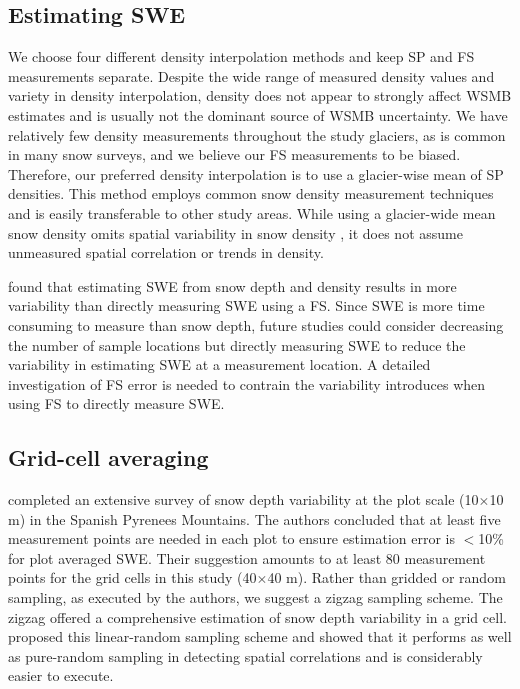 \documentclass[twocolumn,letterpaper]{igs}
\begin{document}
\subsection{Estimating SWE}

We choose four different density interpolation methods and keep SP and FS measurements separate. Despite the wide range of measured density values and variety in density interpolation, density does not appear to strongly affect WSMB estimates and is usually not the dominant source of WSMB uncertainty. We have relatively few density measurements throughout the study glaciers, as is common in many snow surveys, and we believe our FS measurements to be biased. Therefore, our preferred density interpolation is to use a glacier-wise mean of SP densities. This method employs common snow density measurement techniques and is easily transferable to other study areas. While using a glacier-wide mean snow density omits spatial variability in snow density \citep{Wetlaufer2016}, it does not assume unmeasured spatial correlation or trends in density.

\cite{Wetlaufer2016} found that estimating SWE from snow depth and density results in more variability than directly measuring SWE using a FS. Since SWE is more time consuming to measure than snow depth, future studies could consider decreasing the number of sample locations but directly measuring SWE to reduce the variability in estimating SWE at a measurement location. A detailed investigation of FS error is needed to contrain the variability introduces when using FS to directly measure SWE.

\subsection{Grid-cell averaging}

\cite{Lopez2011} completed an extensive survey of snow depth variability at the plot scale (10$\times$10 m) in the Spanish Pyrenees Mountains. The authors concluded that at least five measurement points are needed in each plot to ensure estimation error is $<$10\% for plot averaged SWE. Their suggestion amounts to at least 80 measurement points for the grid cells in this study (40$\times$40 m). Rather than gridded or random sampling, as executed by the authors, we suggest a zigzag sampling scheme. The zigzag offered a comprehensive estimation of snow depth variability in a grid cell. \cite{Shea2010} proposed this linear-random sampling scheme and showed that it performs as well as pure-random sampling in detecting spatial correlations and is considerably easier to execute. 
\end{document}
